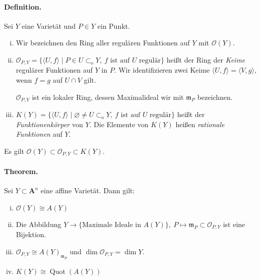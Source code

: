 \documentclass[11pt,b5paper,openany]{memoir}
\begin{document}

\paragraph{Definition.} Sei $Y$ eine Varietät und $P\in Y$ ein Punkt.
\begin{enumerate}[(i)]
\item Wir bezeichnen den Ring aller regulären Funktionen auf $Y$ mit $\mathcal{O}(Y)$.
\item $\mathcal{O}_{P,Y}=\{\langle U,f\rangle\mid P\in U\subset_\text{o} Y,\ f\text{ ist auf $U$ regulär}\}$ heißt der Ring der \textit{Keime} regulärer Funktionen auf $Y$ in $P$. Wir identifizieren zwei Keime $\langle U,f\rangle=\langle V,g\rangle$, wenn $f=g$ auf $U\cap V$ gilt.

$\mathcal{O}_{P,Y}$ ist ein lokaler Ring, dessen Maximalideal wir mit $\mathfrak{m}_P$ bezeichnen.
\item $K(Y)=\{\langle U,f\rangle\mid\varnothing\neq U\subset_\text{o}Y,\ f\text{ ist auf $U$ regulär}\}$ heißt der \textit{Funktionenkörper}  von $Y$. Die Elemente von $K(Y)$ heißen \textit{rationale Funktionen} auf $Y$.
\end{enumerate}
Es gilt $\mathcal{O}(Y)\subset\mathcal{O}_{P,Y}\subset K(Y)$.

\paragraph{Theorem.} Sei $Y\subset\mathbf{A}^n$ eine affine Varietät. Dann gilt:
\begin{enumerate}[(i)]
\item $\mathcal{O}(Y)\cong A(Y)$
\item Die Abbildung $Y\to \{\text{Maximale Ideale in }A(Y)\},\ P\mapsto \mathfrak{m}_P\subset\mathcal{O}_{P,Y}$ ist eine Bijektion.
\item $\mathcal{O}_{P,Y}\cong A(Y)_{\mathfrak{m}_P}$ und $\dim\mathcal{O}_{P,Y}=\dim Y$.
\item $K(Y)\cong\operatorname{Quot}(A(Y))$
\end{enumerate}
\end{document}
